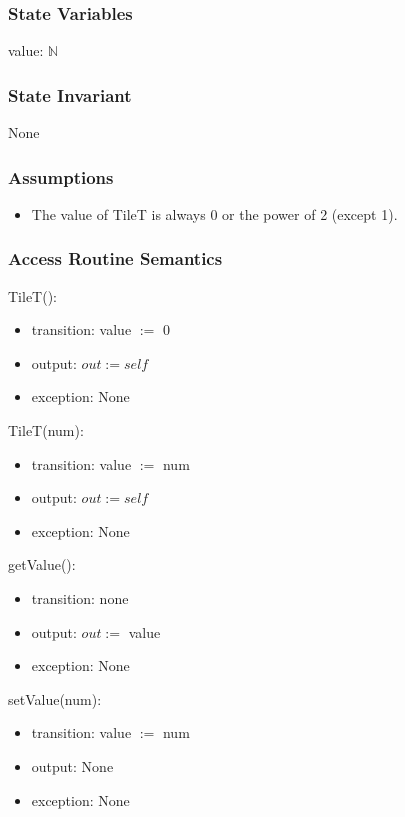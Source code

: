 \documentclass[12pt]{article}
\begin{document}
\subsubsection* {State Variables}

value: $\mathbb{N}$

\subsubsection* {State Invariant}

None

\subsubsection* {Assumptions}

\begin{itemize}
  \item The value of TileT is always 0 or the power of 2 (except 1).
\end{itemize}

\subsubsection* {Access Routine Semantics}

TileT():
\begin{itemize}
\item transition: value $:=$ 0
\item output: $out := \mathit{self}$
\item exception: None
\end{itemize}

\noindent TileT(num):
\begin{itemize}
\item transition: value $:=$ num
\item output: $out := \mathit{self}$
\item exception: None
\end{itemize}

\noindent getValue():
\begin{itemize}
\item transition: none
\item output: $out :=$ value
\item exception: None
\end{itemize}

\noindent setValue(num):
\begin{itemize}
\item transition: value $:=$ num
\item output: None
\item exception: None
\end{itemize}
\end{document}
